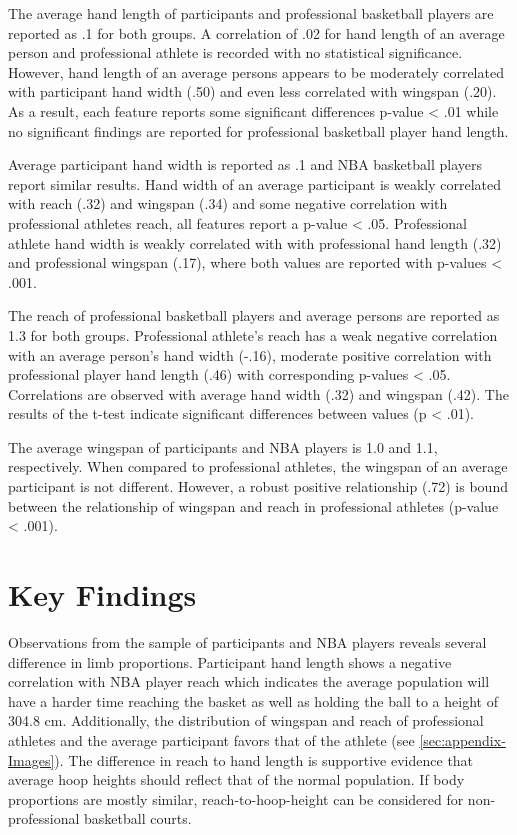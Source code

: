 \documentclass[]{article}
\begin{document}
The average hand length of participants and professional basketball
players are reported as .1 for both groups. A correlation of .02 for
hand length of an average person and professional athlete is recorded
with no statistical significance. However, hand length of an average
persons appears to be moderately correlated with participant hand width
(.50) and even less correlated with wingspan (.20). As a result, each
feature reports some significant differences p-value \textless{} .01
while no significant findings are reported for professional basketball
player hand length.

Average participant hand width is reported as .1 and NBA basketball
players report similar results. Hand width of an average participant is
weakly correlated with reach (.32) and wingspan (.34) and some negative
correlation with professional athletes reach, all features report a
p-value \textless{} .05. Professional athlete hand width is weakly
correlated with with professional hand length (.32) and professional
wingspan (.17), where both values are reported with p-values \textless{}
.001.

The reach of professional basketball players and average persons are
reported as 1.3 for both groups. Professional athlete's reach has a weak
negative correlation with an average person's hand width (-.16),
moderate positive correlation with professional player hand length (.46)
with corresponding p-values \textless{} .05. Correlations are observed
with average hand width (.32) and wingspan (.42). The results of the
t-test indicate significant differences between values (p \textless{}
.01).

The average wingspan of participants and NBA players is 1.0 and 1.1,
respectively. When compared to professional athletes, the wingspan of an
average participant is not different. However, a robust positive
relationship (.72) is bound between the relationship of wingspan and
reach in professional athletes (p-value \textless{} .001).

\section{Key Findings}
\label{sec:findings}

Observations from the sample of participants and NBA players reveals
several difference in limb proportions. Participant hand length shows a
negative correlation with NBA player reach which indicates the average
population will have a harder time reaching the basket as well as
holding the ball to a height of 304.8 cm. Additionally, the distribution
of wingspan and reach of professional athletes and the average
participant favors that of the athlete (see \ref{sec:appendix-Images}).
The difference in reach to hand length is supportive evidence that
average hoop heights should reflect that of the normal population. If
body proportions are mostly similar, reach-to-hoop-height can be
considered for non-professional basketball courts.
\end{document}
